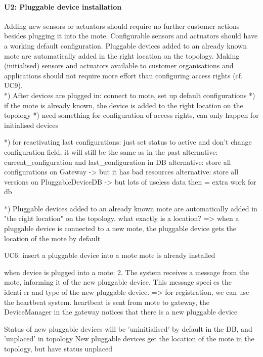     \paragraph{U2: Pluggable device installation}
        Adding new sensors or actuators should require no further customer
        actions besides plugging it into the mote. Configurable sensors and
        actuators should have a working default configuration.
        Pluggable devices added to an already known mote are automatically
        added in the right location on the topology.
        Making (initialised) sensors and actuators available to customer
        organisations and applications should not require more effort than
        configuring access rights (cf. UC9). \\
        *) After devices are plugged in: connect to mote, set up default configurations
        *) if the mote is already known, the device is added to the right location on the topology
        *) need something for configuration of access rights, can only happen for initialised devices

        *) for reactivating last configurations: just set status to active and don't change configuration field, it will still be the same as in the past
            alternative: current_configuration and last_configuration in DB
            alternative: store all configurations on Gateway -> but it has bad resources
            alternative: store all versions on PluggableDeviceDB -> but lots of useless data then = extra work for db

        *) Pluggable devices added to an already known mote are automatically added in "the right location" on the topology.
            what exactly is a location?
            => when a pluggable device is connected to a new mote, the pluggable device gets the location of the mote by default

        UC6: insert a pluggable device into a mote
            mote is already installed

            when device is plugged into a mote:
                2. The system receives a message from the mote, informing it of the new pluggable device. This
                message species the identier and type of the new pluggable device.
                => for registration, we can use the heartbeat system. heartbeat is sent from mote to gateway,
                the DeviceManager in the gateway notices that there is a new pluggable device

                Status of new pluggable devices will be 'uninitialised' by default in the DB, and 'unplaced' in topology
                New pluggable devices get the location of the mote in the topology, but have status unplaced

